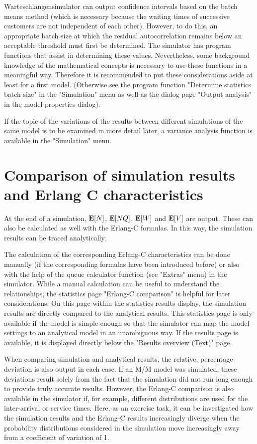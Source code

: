 \documentclass{svmono}
\begin{document}
Warteschlangensimulator can output confidence intervals based on the batch means method (which is necessary because the waiting times of successive customers are not independent of each other). However, to do this, an appropriate batch size at which the residual autocorrelation remains below an acceptable threshold must first be determined. The simulator has program functions that assist in determining these values. Nevertheless, some background knowledge of the mathematical concepts is necessary to use these functions in a meaningful way. Therefore it is recommended to put these considerations aside at least for a first model. (Otherwise see the program function "Determine statistics batch size" in the "Simulation" menu as well as the dialog page "Output analysis" in the model properties dialog).

If the topic of the variations of the results between different simulations of the same model is to be examined in more detail later, a variance analysis function is available in the "Simulation" menu.



\section{Comparison of simulation results and Erlang C characteristics}

At the end of a simulation, ${\bf E}[N]$, ${\bf E}[NQ]$, ${\bf E}[W]$ and ${\bf E}[V]$ are output. These can also be calculated as well with the Erlang-C formulas. In this way, the simulation results can be traced analytically.

The calculation of the corresponding Erlang-C characteristics can be done manually (if the corresponding formulas have been introduced before) or also with the help of the queue calculator function (see "Extras" menu) in the simulator. While a manual calculation can be useful to understand the relationships, the statistics page "Erlang-C comparison" is helpful for later considerations: On this page within the statistics results display, the simulation results are directly compared to the analytical results. This statistics page is only available if the model is simple enough so that the simulator can map the model settings to an analytical model in an unambiguous way. If the results page is available, it is displayed directly below the "Results overview (Text)" page.

When comparing simulation and analytical results, the relative, percentage deviation is also output in each case. If an M/M model was simulated, these deviations result solely from the fact that the simulation did not run long enough to provide truly accurate results. However, the Erlang-C comparison is also available in the simulator if, for example, different distributions are used for the inter-arrival or service times. Here, as an exercise task, it can be investigated how the simulation results and the Erlang-C results increasingly diverge when the probability distributions considered in the simulation move increasingly away from a coefficient of variation of 1.
\end{document}
